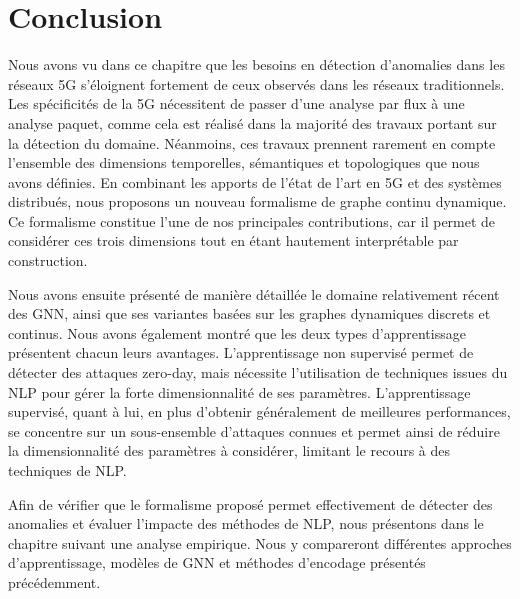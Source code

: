 \documentclass[a4paper,11pt,twoside]{StyleThese}
\begin{document}
\section{Conclusion}
Nous avons vu dans ce chapitre que les besoins en détection d'anomalies dans les réseaux 5G s'éloignent fortement de ceux observés dans les réseaux traditionnels. Les spécificités de la 5G nécessitent de passer d'une analyse par flux à une analyse paquet, comme cela est réalisé dans la majorité des travaux portant sur la détection du domaine. Néanmoins, ces travaux prennent rarement en compte l’ensemble des dimensions temporelles, sémantiques et topologiques que nous avons définies. En combinant les apports de l’état de l’art en 5G et des systèmes distribués, nous proposons un nouveau formalisme de graphe continu dynamique. Ce formalisme constitue l’une de nos principales contributions, car il permet de considérer ces trois dimensions tout en étant hautement interprétable par construction.

Nous avons ensuite présenté de manière détaillée le domaine relativement récent des GNN, ainsi que ses variantes basées sur les graphes dynamiques discrets et continus. Nous avons également montré que les deux types d’apprentissage présentent chacun leurs avantages. L’apprentissage non supervisé permet de détecter des attaques zero-day, mais nécessite l’utilisation de techniques issues du NLP pour gérer la forte dimensionnalité de ses paramètres. L’apprentissage supervisé, quant à lui, en plus d’obtenir généralement de meilleures performances, se concentre sur un sous-ensemble d’attaques connues et permet ainsi de réduire la dimensionnalité des paramètres à considérer, limitant le recours à des techniques de NLP.

Afin de vérifier que le formalisme proposé permet effectivement de détecter des anomalies et évaluer l'impacte des méthodes de NLP, nous présentons dans le chapitre suivant une analyse empirique. Nous y compareront différentes approches d'apprentissage, modèles de GNN et méthodes d'encodage présentés précédemment.

\ifdefined{}
\else


\end{document}
